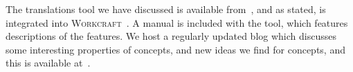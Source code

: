 \documentclass[british,conference,compsoc]{IEEEtran}
\newcommand{\noun}[1]{\textsc{#1}}
\begin{document}
The translations tool we have discussed is available from~\cite{2016_concepts_github},
and as stated, is integrated into \noun{Workcraft}~\cite{Workcraft_website}. 
A manual is included with the tool, which features descriptions of the features. 
We host a regularly updated blog which discusses some interesting properties
of concepts, and new ideas we find for concepts, and this is available 
at~\cite{2016_blog_concepts}.




\end{document}

